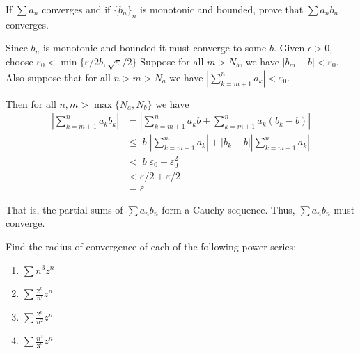 \documentclass[12 pt, letterpaper]{hmcpset}
\begin{document}
\pagebreak

\begin{problem}
	If $\sum a_{n}$ converges and if $\{ b_{n} \}_{n}$ is monotonic and bounded, prove that $\sum a_{n} b_{n}$ converges.
\end{problem}

\begin{solution}
	Since $b_{n}$ is monotonic and bounded it must converge to some $b$. Given $\epsilon > 0$, choose $ \varepsilon_{0} < \min \{ \varepsilon/2b, \sqrt{\varepsilon}/2 \}$ Suppose for all $m > N_{b}$, we have  $\lvert b_{m} - b \rvert < \varepsilon_{0}$. Also suppose that for all $n > m > N_{a}$ we have $\left \lvert \sum_{k = m + 1}^{n} a_{k} \right \rvert < \varepsilon_{0}$.

	Then for all $n, m > \max \{ N_{a}, N_{b} \}$ we have
	\[
		\begin{split}
			\left \lvert \sum_{k = m + 1}^{n} a_{k} b_{k} \right \rvert & = \left \lvert \sum_{k = m + 1}^{n} a_{k} b + \sum_{k = m + 1}^{n} a_{k} (b_{k} - b) \right \rvert \\
										    & \le \lvert b \rvert \left \lvert \sum_{k = m + 1}^{n} a_{k} \right \rvert + \lvert b_{k} - b \rvert \left \lvert \sum_{k = m + 1}^{n} a_{k} \right \rvert \\
										    & < \lvert b \rvert \varepsilon_{0} + \varepsilon_{0}^{2} \\
										    & < \varepsilon/2 + \varepsilon/2 \\
										    & = \varepsilon.
		\end{split}
	\]

	That is, the partial sums of $\sum a_{n} b_{n}$ form a Cauchy sequence. Thus, $\sum a_{n} b_{n}$ must converge.
\end{solution}

\pagebreak

\begin{problem}
	Find the radius of convergence of each of the following power series:
	\begin{enumerate}
		\item $\sum n^{3} z^{n}$ 
		\item $\sum \frac{2^{n}}{n!} z^{n}$ 
		\item $\sum \frac{2^{n}}{n^{2}} z^{n}$ 
		\item $\sum \frac{n^{3}}{3^{n}} z^{n}$
	\end{enumerate}
\end{problem}
\end{document}
